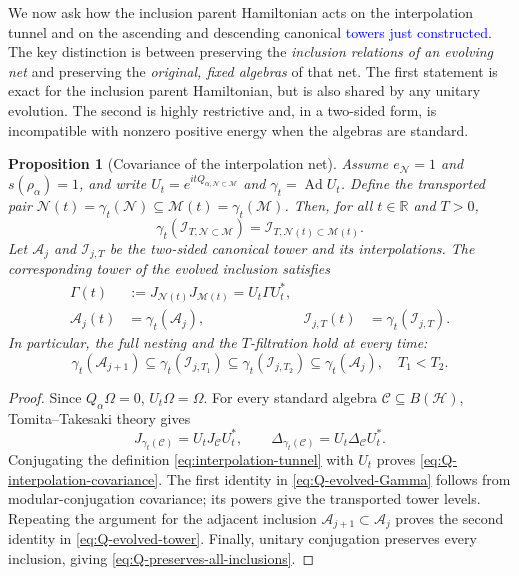 \documentclass[a4paper,11pt]{article}
\newtheorem{proposition}[theorem]{Proposition}
\theoremstyle{definition}
\newcommand{\mA}{\mathcal{A}}
\newcommand{\mN}{\mathcal{N}}
\newcommand{\mI}{\mathcal{I}}
\newcommand{\mH}{\mathcal{H}}
\newcommand{\mM}{\mathcal{M}}
\newcommand{\NL}[1]{\textcolor{blue}{#1}}
\begin{document}
We now ask how the inclusion parent Hamiltonian acts on the
interpolation tunnel and on the ascending and descending canonical
\NL{towers just constructed.} The key distinction
is between preserving the \emph{inclusion relations of an evolving net}
and preserving the \emph{original, fixed algebras} of that net.
The first statement is exact for the inclusion parent Hamiltonian,
but is also shared by any unitary evolution. The second is highly
restrictive and, in a two-sided form, is incompatible with nonzero
positive energy when the algebras are standard.

\begin{proposition}[Covariance of the interpolation net]
\label{prop:Q-interpolation-covariance}
Assume $e_{\mN}=1$ and $s(\rho_\alpha)=1$, and write
$U_t=e^{itQ_{\alpha,\mN\subset\mM}}$ and
$\gamma_t=\operatorname{Ad}U_t$. Define the transported pair
$\mN(t)=\gamma_t(\mN)\subseteq\mM(t)=\gamma_t(\mM)$.
Then, for all $t\in\mathbb R$ and $T>0$,
\begin{equation}
 \boxed{\quad
 \gamma_t(\mI_{T,\mN\subset\mM})
 =\mI_{T,\mN(t)\subset\mM(t)}.
 \quad}
 \label{eq:Q-interpolation-covariance}
\end{equation}
Let $\mA_j$ and $\mI_{j,T}$ be the two-sided canonical tower
and its interpolations. The corresponding tower of the evolved
inclusion satisfies
\begin{align}
 \Gamma(t)&:=J_{\mN(t)}J_{\mM(t)}=U_t\Gamma U_t^*,
 \label{eq:Q-evolved-Gamma}\\
 \mA_j(t)&=\gamma_t(\mA_j),&
 \mI_{j,T}(t)&=\gamma_t(\mI_{j,T}).
 \label{eq:Q-evolved-tower}
\end{align}
In particular, the full nesting and the $T$-filtration hold at every
time:
\begin{equation}
 \boxed{\quad
 \gamma_t(\mA_{j+1})\subseteq
 \gamma_t(\mI_{j,T_1})\subseteq
 \gamma_t(\mI_{j,T_2})\subseteq
 \gamma_t(\mA_j),\quad T_1<T_2.
 \quad}
 \label{eq:Q-preserves-all-inclusions}
\end{equation}
\end{proposition}
\begin{proof}
Since $Q_\alpha\Omega=0$, $U_t\Omega=\Omega$. For every
standard algebra $\mathcal C\subseteq B(\mH)$,
Tomita--Takesaki theory gives
\begin{equation}
 J_{\gamma_t(\mathcal C)}=U_tJ_{\mathcal C}U_t^*,
 \qquad
 \Delta_{\gamma_t(\mathcal C)}=U_t\Delta_{\mathcal C}U_t^*.
 \label{eq:Q-Tomita-transport}
\end{equation}
Conjugating the definition \eqref{eq:interpolation-tunnel}
with $U_t$ proves \eqref{eq:Q-interpolation-covariance}.
The first identity in \eqref{eq:Q-evolved-Gamma} follows from
modular-conjugation covariance; its powers give the transported
tower levels. Repeating the argument for the adjacent inclusion
$\mA_{j+1}\subset\mA_j$ proves the second identity in
\eqref{eq:Q-evolved-tower}. Finally, unitary conjugation preserves
every inclusion, giving \eqref{eq:Q-preserves-all-inclusions}.
\end{proof}
\end{document}
